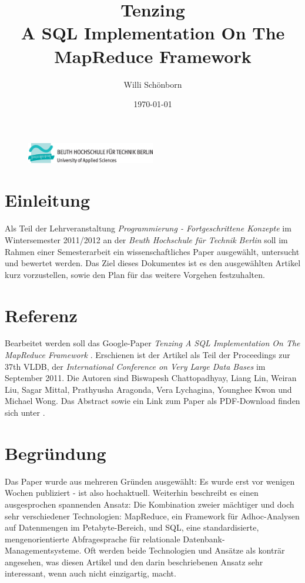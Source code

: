 \documentclass[a4paper]{article}
\title{Tenzing \\ A SQL Implementation On The MapReduce Framework}
\author{Willi Schönborn}
\date{\today}
\begin{document}
\begin{figure}[H]
\centering
\includegraphics[width=0.5\textwidth]{beuth.eps}
\maketitle
\end{figure}

\section*{Einleitung}
Als Teil der Lehrveranstaltung \textit{Programmierung - Fortgeschrittene Konzepte} im Wintersemester 2011/2012 an der \textit{Beuth Hochschule für Technik Berlin} soll im Rahmen einer Semesterarbeit ein wissenschaftliches Paper ausgewählt, untersucht und bewertet werden. Das Ziel dieses Dokumentes ist es den ausgewählten Artikel kurz vorzustellen, sowie den Plan für das weitere Vorgehen festzuhalten.

\section*{Referenz}
Bearbeitet werden soll das Google-Paper \textit{Tenzing A SQL Implementation On The MapReduce Framework} \cite{TENZING}. Erschienen ist der Artikel als Teil der Proceedings zur 37th VLDB, der \textit{International Conference on Very Large Data Bases} im September 2011. Die Autoren sind Biswapesh Chattopadhyay, Liang Lin, Weiran Liu, Sagar Mittal, Prathyusha Aragonda, Vera Lychagina, Younghee Kwon und Michael Wong. Das Abstract sowie ein Link zum Paper als PDF-Download finden sich unter \cite{GOOGLE-TENZING}.

\section*{Begründung}
Das Paper wurde aus mehreren Gründen ausgewählt: Es wurde erst vor wenigen Wochen publiziert - ist also hochaktuell. Weiterhin beschreibt es einen ausgesprochen spannenden Ansatz: Die Kombination zweier mächtiger und doch sehr verschiedener Technologien: MapReduce, ein Framework für Adhoc-Analysen auf Datenmengen im Petabyte-Bereich, und SQL, eine standardisierte, mengenorientierte Abfragesprache für relationale Datenbank-Managementsysteme. Oft werden beide Technologien und Ansätze als konträr angesehen, was diesen Artikel und den darin beschriebenen Ansatz sehr interessant, wenn auch nicht einzigartig, macht.
\end{document}
